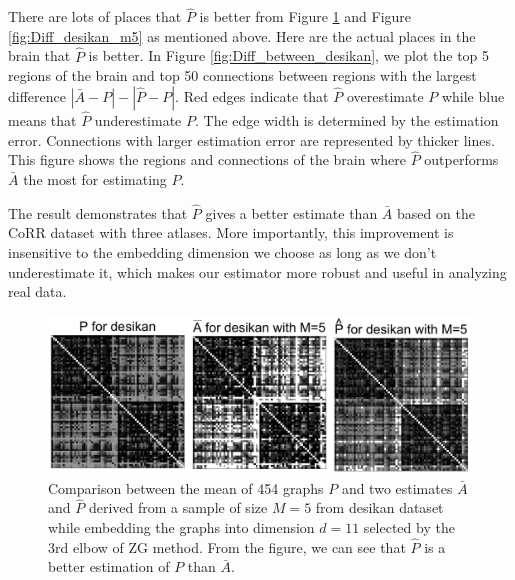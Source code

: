 \documentclass[a4paper]{article}
\begin{document}
There are lots of places that $\hat{P}$ is better from Figure \ref{fig:Matrix_desikan_m5} and Figure \ref{fig:Diff_desikan_m5} as mentioned above. Here are the actual places in the brain that $\hat{P}$ is better. In Figure \ref{fig:Diff_between_desikan}, we plot the top 5 regions of the brain and top 50 connections between regions with the largest difference $|\bar{A} - P| - |\hat{P} - P|$. Red edges indicate that $\hat{P}$ overestimate $P$ while blue means that $\hat{P}$ underestimate $P$. The edge width is determined by the estimation error. Connections with larger estimation error are represented by thicker lines. This figure shows the regions and connections of the brain where $\hat{P}$ outperforms $\bar{A}$ the most for estimating $P$.

The result demonstrates that $\hat{P}$ gives a better estimate than $\bar{A}$ based on the CoRR dataset with three atlases. 
More importantly, this improvement is insensitive to the embedding dimension we choose as long as we don't underestimate it, which makes our estimator more robust and useful in analyzing real data.

\begin{figure}[!htb]
\centering
\includegraphics[width=1\textwidth]{Matrix_desikan_m5.png}
\caption{Comparison between the mean of 454 graphs $P$ and two estimates $\bar{A}$ and $\hat{P}$ derived from a sample of size $M=5$ from desikan dataset while embedding the graphs into dimension $d=11$ selected by the 3rd elbow of ZG method. From the figure, we can see that $\hat{P}$ is a better estimation of $P$ than $\bar{A}$.}
\label{fig:Matrix_desikan_m5}
\end{figure}
\end{document}
